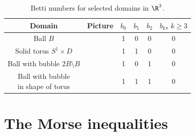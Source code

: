 \begin{table}
  \centering
  \renewcommand{\arraystretch}{3}
  \begin{tabular}{c|c|c|c|c|c}
    Domain & Picture & $b_0$ & $b_1$ & $b_2$ & $b_k$, $k\geq3$ \\ \hline
    Ball $B$ & 
    \begin{minipage}{0.1\textwidth}
      \def\svgwidth{\textwidth}
      
    \end{minipage}
    & 1 & 0 & 0 & 0 \\
    Solid torus $S^1\times D$ & 
    \begin{minipage}{0.1\textwidth}
      \def\svgwidth{\textwidth}
      
    \end{minipage}
    & 1 & 1 & 0 & 0 \\
    Ball with bubble $2B\setminus B$ & 
    \begin{minipage}{0.1\textwidth}
      \def\svgwidth{\textwidth}
      
    \end{minipage}
    & 1 & 0 & 1 & 0 \\
    \makecell{Ball with bubble \\in shape of torus} & 
    \begin{minipage}{0.1\textwidth}
      \def\svgwidth{\textwidth}
      
    \end{minipage}
    & 1 & 1 & 1 & 0 \\
  \end{tabular}
  \caption{Betti numbers for selected domains in $\R^3$.}
  \label{tb:n3_domains_bettiNbrs}
\end{table}


\section{The Morse inequalities}


